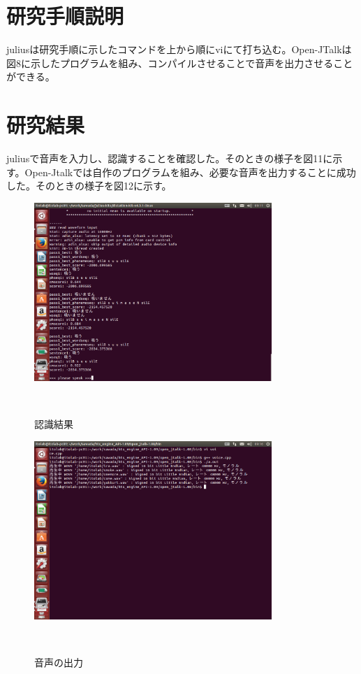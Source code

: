 \documentclass[11pt]{jsarticle}
\begin{document}
\section{研究手順説明}
juliusは研究手順に示したコマンドを上から順にviにて打ち込む。Open-JTalkは図8に示したプログラムを組み、コンパイルさせることで音声を出力させることができる。


\section{研究結果}
juliusで音声を入力し、認識することを確認した。そのときの様子を図11に示す。Open-Jtalkでは自作のプログラムを組み、必要な音声を出力することに成功した。そのときの様子を図12に示す。

\begin{figure}[b]
 \begin{center}
  \includegraphics[width=90mm]{ninshiki.png}
 　\caption{認識結果}
 　\label{fig:kinshi}
 \end{center}
\end{figure}

\begin{figure}[b]
 \begin{center}
  \includegraphics[width=90mm]{konpairu.png}
 　\caption{音声の出力}
 　\label{fig:kinshi}
 \end{center}
\end{figure}
\end{document}
